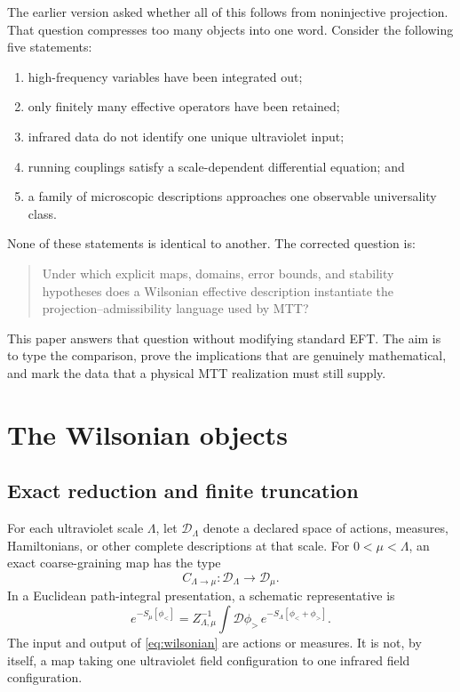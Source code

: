 \documentclass[11pt]{article}
\theoremstyle{definition}
\theoremstyle{remark}
\begin{document}
The earlier version asked whether all of this follows from noninjective
projection.  That question compresses too many objects into one word.
Consider the following five statements:

\begin{enumerate}[label=(Q\arabic*)]
\item high-frequency variables have been integrated out;
\item only finitely many effective operators have been retained;
\item infrared data do not identify one unique ultraviolet input;
\item running couplings satisfy a scale-dependent differential equation; and
\item a family of microscopic descriptions approaches one observable
  universality class.
\end{enumerate}

None of these statements is identical to another.  The corrected question is:

\begin{quote}
Under which explicit maps, domains, error bounds, and stability hypotheses
does a Wilsonian effective description instantiate the
projection--admissibility language used by MTT?
\end{quote}

This paper answers that question without modifying standard EFT.  The aim is
to type the comparison, prove the implications that are genuinely
mathematical, and mark the data that a physical MTT realization must still
supply.

\section{The Wilsonian objects}
\label{sec:objects}

\subsection{Exact reduction and finite truncation}

For each ultraviolet scale \(\Lambda\), let \(\mathcal D_\Lambda\) denote a
declared space of actions, measures, Hamiltonians, or other complete
descriptions at that scale.  For \(0<\mu<\Lambda\), an exact coarse-graining
map has the type
\[
 C_{\Lambda\to\mu}:\mathcal D_\Lambda\longrightarrow\mathcal D_\mu.
\]
In a Euclidean path-integral presentation, a schematic representative is
\begin{equation}
 e^{-S_\mu[\phi_<]}
 =
 Z_{\Lambda,\mu}^{-1}
 \int \mathcal D\phi_>\,
 e^{-S_\Lambda[\phi_<+\phi_>]} .
\label{eq:wilsonian}
\end{equation}
The input and output of \cref{eq:wilsonian} are actions or measures.  It is
not, by itself, a map taking one ultraviolet field configuration to one
infrared field configuration.
\end{document}
